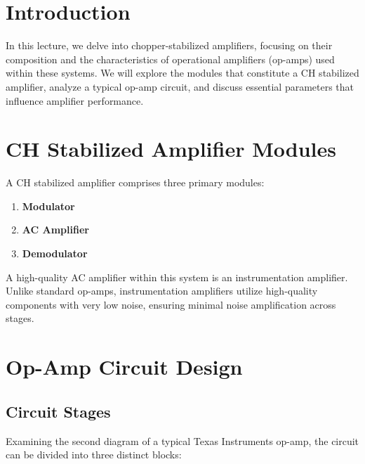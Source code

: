 \section{Introduction}

In this lecture, we delve into chopper-stabilized amplifiers, focusing on their composition and the characteristics of operational amplifiers (op-amps) used within these systems. We will explore the modules that constitute a CH stabilized amplifier, analyze a typical op-amp circuit, and discuss essential parameters that influence amplifier performance.

\section{CH Stabilized Amplifier Modules}

A CH stabilized amplifier comprises three primary modules:

\begin{enumerate}
    \item \textbf{Modulator}
    \item \textbf{AC Amplifier}
    \item \textbf{Demodulator}
\end{enumerate}

A high-quality AC amplifier within this system is an instrumentation amplifier. Unlike standard op-amps, instrumentation amplifiers utilize high-quality components with very low noise, ensuring minimal noise amplification across stages.

\section{Op-Amp Circuit Design}

\subsection{Circuit Stages}

Examining the second diagram of a typical Texas Instruments op-amp, the circuit can be divided into three distinct blocks:

